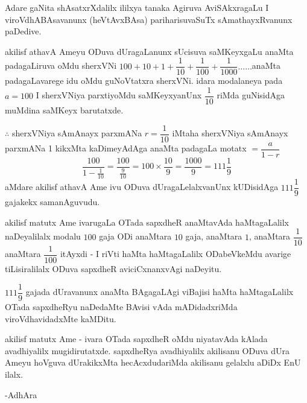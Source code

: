 Adare gaNita shAsatxrXdalilx ililxya tanaka Agiruva AviSAkxragaLu I viroVdhABAsavanunx (heVtAvxBAsa) pariharisuvaSuTx sAmathayxRvanunx paDedive.

akilisf athavA Ameyu ODuva dUragaLanunx sUcisuva saMKeyxgaLu anaMta padagaLiruva oMdu sherxVNi $100+10+1+\dfrac{1}{10}+\dfrac{1}{100}+\dfrac{1}{1000}\ldots\ldots$anaMta padagaLavarege idu oMdu guNoVtatxra sherxVNi. idara modalaneya pada $a=100$ I sherxVNiya parxtiyoMdu saMKeyxyanUnx $\dfrac{1}{10}$ riMda guNisidAga muMdina saMKeyx barutatxde.

$\therefore$ sherxVNiya sAmAnayx parxmANa $r=\dfrac{1}{10}$ iMtaha sherxVNiya sAmAnayx parxmANa {\rm 1} kikxMta kaDimeyAdAga anaMta padagaLa motatx $=\dfrac{a}{1-r}$
$$
\frac{100}{1-\frac{1}{10}}=\frac{100}{\frac{9}{10}}=100\times \frac{10}{9}=\frac{1000}{9}=111\frac{1}{9}
$$
aMdare akilisf athavA Ame ivu ODuva dUragaLelalxvanUnx kUDisidAga $111\dfrac{1}{9}$ gajakekx samanAguvudu.

akilisf matutx Ame ivarugaLa OTada sapxdheR anaMtavAda haMtagaLalilx naDeyalilalx modalu $100$ gaja ODi anaMtara $10$ gaja, anaMtara $1$, anaMtara $\dfrac{1}{10}$ anaMtara $\dfrac{1}{100}$ itAyxdi - I riVti haMta haMtagaLalilx ODabeVkeMdu avarige tiLisiralilalx ODuva sapxdheR aviciCxnanxvAgi naDeyitu.

$111\dfrac{1}{9}$ gajada dUravanunx anaMta BAgagaLAgi viBajisi haMta haMtagaLalilx OTada sapxdheRyu naDedaMte BAvisi vAda mADidadxriMda viroVdhavidadxMte kaMDitu. 

akilisf matutx Ame - ivara OTada sapxdheR oMdu niyatavAda kAlada avadhiyalilx mugidirutatxde. sapxdheRya avadhiyalilx akilisanu ODuva dUra Ameyu hoVguva dUrakikxMta hecAcxdudariMda akilisanu gelalxlu aDiDx EnU ilalx.

\hfill{-AdhAra}

